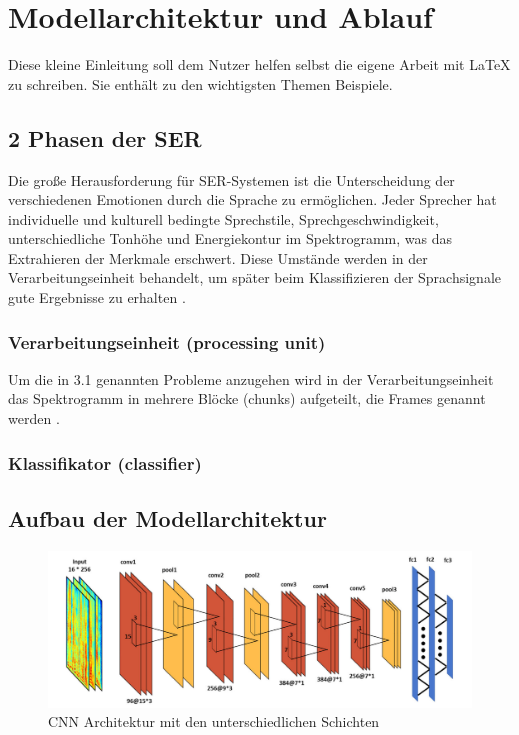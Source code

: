 \chapter{Modellarchitektur und Ablauf}

Diese kleine Einleitung soll dem Nutzer helfen selbst die eigene Arbeit mit \LaTeX{} zu schreiben. Sie enthält zu den wichtigsten Themen Beispiele.


\section{2 Phasen der SER}

Die große Herausforderung für SER-Systemen ist die Unterscheidung der verschiedenen Emotionen durch die Sprache zu ermöglichen. Jeder Sprecher hat individuelle und kulturell bedingte Sprechstile, Sprechgeschwindigkeit, unterschiedliche Tonhöhe und Energiekontur im Spektrogramm, was das Extrahieren der Merkmale erschwert. Diese Umstände werden in der Verarbeitungseinheit behandelt, um später beim Klassifizieren der Sprachsignale gute Ergebnisse zu erhalten \cite{badshah2019deep}. 

\subsection{Verarbeitungseinheit (processing unit)}
Um die in 3.1 genannten Probleme anzugehen wird in der Verarbeitungseinheit das Spektrogramm in mehrere Blöcke (chunks) aufgeteilt, die Frames genannt werden \cite{badshah2019deep}.
\subsection{Klassifikator (classifier)}


\section{Aufbau der Modellarchitektur}


\begin{figure}[ht]
    \centering
    \includegraphics[width=1\textwidth]{images/conv}
    \caption{\label{architektur}CNN Architektur mit den unterschiedlichen Schichten \cite{badshah2019deep}}
\end{figure}

